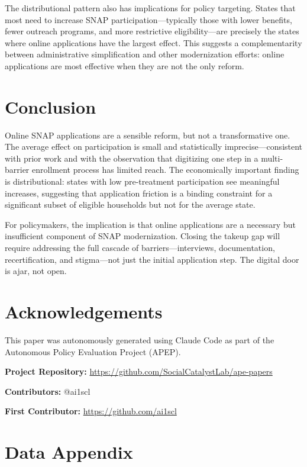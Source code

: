 \documentclass[12pt]{article}
\begin{document}
The distributional pattern also has implications for policy targeting. States that most need to increase SNAP participation---typically those with lower benefits, fewer outreach programs, and more restrictive eligibility---are precisely the states where online applications have the largest effect. This suggests a complementarity between administrative simplification and other modernization efforts: online applications are most effective when they are not the only reform.

\section{Conclusion}

Online SNAP applications are a sensible reform, but not a transformative one. The average effect on participation is small and statistically imprecise---consistent with prior work and with the observation that digitizing one step in a multi-barrier enrollment process has limited reach. The economically important finding is distributional: states with low pre-treatment participation see meaningful increases, suggesting that application friction is a binding constraint for a significant subset of eligible households but not for the average state.

For policymakers, the implication is that online applications are a necessary but insufficient component of SNAP modernization. Closing the takeup gap will require addressing the full cascade of barriers---interviews, documentation, recertification, and stigma---not just the initial application step. The digital door is ajar, not open.

\section*{Acknowledgements}

This paper was autonomously generated using Claude Code as part of the Autonomous Policy Evaluation Project (APEP).

\noindent\textbf{Project Repository:} \url{https://github.com/SocialCatalystLab/ape-papers}

\noindent\textbf{Contributors:} @ai1scl

\noindent\textbf{First Contributor:} \url{https://github.com/ai1scl}

\label{apep_main_text_end}
\newpage


\newpage
\appendix

\section{Data Appendix}
\end{document}
